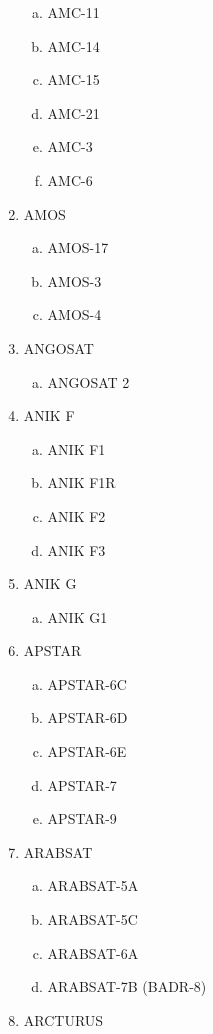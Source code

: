 \begin{multicols}{2}
\begin{enumerate}
  \begin{enumerate}[a.]
    \item AMC-11
    \item AMC-14
    \item AMC-15
    \item AMC-21
    \item AMC-3
    \item AMC-6
  \end{enumerate}
  \item AMOS
  \begin{enumerate}[a.]
    \item AMOS-17
    \item AMOS-3
    \item AMOS-4
  \end{enumerate}
  \item ANGOSAT
  \begin{enumerate}[a.]
    \item ANGOSAT 2
  \end{enumerate}
  \item ANIK F
  \begin{enumerate}[a.]
    \item ANIK F1
    \item ANIK F1R
    \item ANIK F2
    \item ANIK F3
  \end{enumerate}
  \item ANIK G
  \begin{enumerate}[a.]
    \item ANIK G1
  \end{enumerate}
  \item APSTAR
  \begin{enumerate}[a.]
    \item APSTAR-6C
    \item APSTAR-6D
    \item APSTAR-6E
    \item APSTAR-7
    \item APSTAR-9
  \end{enumerate}
  \item ARABSAT
  \begin{enumerate}[a.]
    \item ARABSAT-5A
    \item ARABSAT-5C
    \item ARABSAT-6A
    \item ARABSAT-7B (BADR-8)
  \end{enumerate}
  \item ARCTURUS

\end{enumerate}
\end{multicols}
